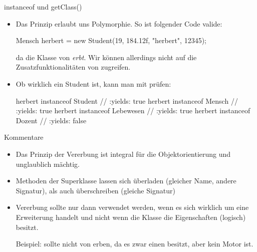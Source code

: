 \begin{frame}[fragile]{instanceof und getClass()}
    \begin{itemize}[<+(1)->]
        \widei
        \item Das Prinzip erlaubt uns Polymorphie.\pause{} So ist folgender Code valide:\pause{}
\begin{plainjava}
Mensch herbert = new Student(19, 184.12f, "herbert", 12345);
\end{plainjava}
        \pause{}da die Klasse  von  \emph{erbt}.\pause{} Wir können allerdings nicht auf die Zusatzfunktionalitäten von  zugreifen.
        \item Ob  wirklich ein Student ist,\pause{} kann man mit  prüfen:\pause{}
\begin{plainjava}
herbert instanceof Student // :yields: true
herbert instanceof Mensch // :yields: true
herbert instanceof Lebewesen // :yields: true
herbert instanceof Dozent // :yields: false
\end{plainjava}
    \end{itemize}
\end{frame}


\begin{frame}{Kommentare}
    \begin{itemize}[<+(1)->]
        \widei
        \item Das Prinzip der Vererbung ist integral für die Objektorientierung und unglaublich mächtig.
        \item Methoden der Superklasse lassen sich überladen (gleicher Name, andere Signatur),\pause{} als auch überschreiben (gleiche Signatur)
        \item Vererbung sollte nur dann verwendet werden,\pause{} wenn es sich wirklich um eine Erweiterung handelt und nicht wenn die Klasse  die Eigenschaften (logisch) besitzt.\pause{} \medskip\par Beispiel:  sollte nicht von  erben, da es zwar einen besitzt, aber kein Motor ist.
    \end{itemize}
\end{frame}


